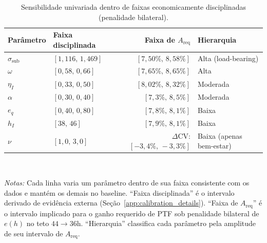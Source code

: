 \documentclass[12pt,a4paper]{article}
\begin{document}
\begin{table}[htbp]
\centering
\caption{Sensibilidade univariada dentro de faixas economicamente disciplinadas (penalidade bilateral).}\label{tab:sensitivity_univariate}
\small
\begin{tabular}{llrl}
\hline\hline
Par\^ametro & Faixa disciplinada & Faixa de $A_{\text{req}}$ & Hierarquia \\
\hline
$\sigma_{\text{sub}}$ & $[1{,}116,\,1{,}469]$ & $[7{,}50\%,\,8{,}58\%]$ & Alta (load-bearing) \\
$\omega$ & $[0{,}58,\,0{,}66]$ & $[7{,}65\%,\,8{,}65\%]$ & Alta \\
$\eta_I$ & $[0{,}33,\,0{,}50]$ & $[8{,}02\%,\,8{,}32\%]$ & Moderada \\
$\alpha$ & $[0{,}30,\,0{,}40]$ & $[7{,}3\%,\,8{,}5\%]$ & Moderada \\
$e_q$ & $[0{,}40,\,0{,}80]$ & $[7{,}8\%,\,8{,}1\%]$ & Baixa \\
$h_I$ & $[38,\,46]$ & $[7{,}9\%,\,8{,}1\%]$ & Baixa \\
$\nu$ & $[1{,}0,\,3{,}0]$ & $\Delta$CV: $[-3{,}4\%,\,-3{,}3\%]$ & Baixa (apenas bem-estar) \\
\hline\hline
\end{tabular}
\\[2pt]
\begin{minipage}{0.95\textwidth}
\justifying
{\footnotesize \textit{Notas:} Cada linha varia um par\^ametro dentro de sua faixa consistente com os dados e mant\'em os demais no baseline. ``Faixa disciplinada'' \'e o intervalo derivado de evid\^encia externa (Se\c{c}\~ao~\ref{app:calibration_details}). ``Faixa de $A_{\text{req}}$'' \'e o intervalo implicado para o ganho requerido de PTF sob penalidade bilateral de $e(h)$ no teto $44\to 36$h. ``Hierarquia'' classifica cada par\^ametro pela amplitude de seu intervalo de $A_{\text{req}}$.}
\end{minipage}
\end{table}
\end{document}
